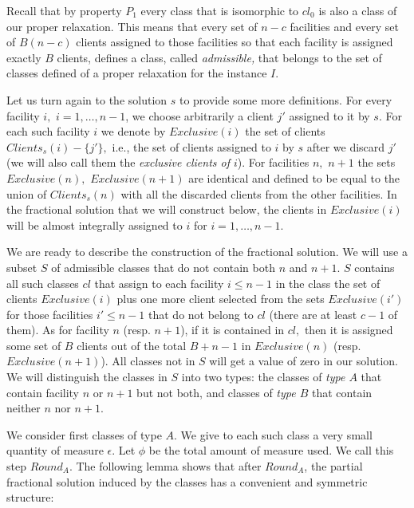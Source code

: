 \documentclass[11pt]{article}
\begin{document}
Recall that by property $P_1$ every class that is isomorphic to $cl_0$ is
also a class of our proper relaxation. This means that
every set  of $n-c$ facilities and every  set of $B(n-c)$ clients
assigned to those facilities so that each facility is assigned exactly
$B$ clients, defines a class, called {\em admissible,} that belongs to the set of classes
defined of a  proper relaxation for the instance $I$.

Let  us  turn  again  to  the solution  $s$  to  provide  some  more
definitions.  For   every  facility  $i,$   $i=1,\ldots, n-1$,  we  choose
arbitrarily a client $j'$ assigned to  it by $s$. For each such facility
$i$  we   denote  by  $Exclusive(i)$   the  set  of   clients  $
Clients_s(i) - \{j' \},$ i.e., the set of clients assigned to
$i$ by $s$ after we discard $j'$ (we will also call them the
{\em exclusive clients of $i$}). For facilities $n,$ $n+1$ the sets
$Exclusive(n),$ $Exclusive(n+1)$ are identical  and defined to be equal to 
 the union of $Clients_s(n)$ with all
the  discarded clients from  the other  facilities. In  the fractional
solution that we will construct below, the clients in $Exclusive(i)$
will be almost integrally assigned to $i$ for $i=1,\ldots ,n-1$.

We  are   ready  to  describe  the  construction   of  the  fractional
solution. We will use a subset $S$ of admissible classes that 
do not contain both $n$ and  $n+1$. $S$ contains all such classes   
 $cl$ that assign to each facility $i \leq
n-1$  in the class  the set  of clients  $Exclusive(i)$ plus  one more
client selected  from the sets $Exclusive(i')$  for those facilities
$i' \leq n-1$ that do not belong  to $cl$ (there are at least $c-1$
of them). As for facility $n$ (resp. $n+1$), if it  is contained in $cl,$ then
it is  assigned some set  of $B$ clients  out of the total  $B+n-1$ in
$Exclusive(n)$ (resp. $Exclusive(n+1)$).  
All classes not in $S$  will get a value
of zero in our solution.
We
will distinguish the classes in $S$ into two types: the classes
of {\em type $A$} that contain facility  $n$ or $n+1$ but not both, and classes
of {\em type $B$} that
 contain neither $n$ nor $n+1$.

We consider  first classes of type  $A$. We give  to each such class   a
very small  quantity of  measure $\epsilon$. Let  $\phi$ be  the total
amount of measure used. We call this step $Round_A$.  The
following  lemma shows  that after  $Round_A$, the  partial fractional
solution  induced  by  the  classes  has a  convenient  and  symmetric
structure:
\end{document}

